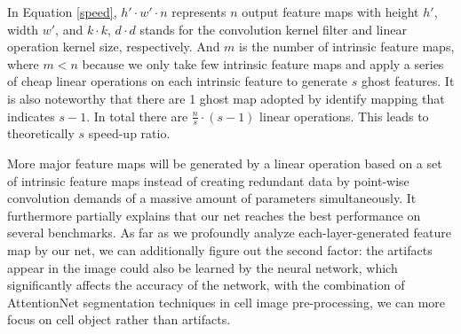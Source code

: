 In Equation \eqref{speed}, ${h}' \cdot {w}' \cdot {n}$ represents  $n$ output feature maps with height ${h}'$, width ${w}'$, and $k \cdot k$, $d \cdot d$ stands for the convolution kernel filter and linear operation kernel size, respectively. And $m$ is the number of intrinsic feature maps, where $m < n$ because we only take few intrinsic feature maps and apply a series of cheap linear operations on each intrinsic feature to generate $s$ ghost features. It is also noteworthy that there are 1 ghost map adopted by identify mapping that indicates $s-1$. In total there are $\frac{n}{s} \cdot(s-1)$  linear operations. This leads to theoretically $s$ speed-up ratio.

More major feature maps will be generated by a linear operation based on a set of intrinsic feature maps instead of creating redundant data by point-wise convolution demands of a massive amount of parameters simultaneously. It furthermore partially explains that our net reaches the best performance on several benchmarks.
As far as we profoundly analyze each-layer-generated feature map by our net, we can additionally figure out the second factor: the artifacts appear in the image could also be learned by the neural network, which significantly affects the accuracy of the network, with the combination of AttentionNet segmentation techniques in cell image pre-processing, we can more focus on cell object rather than artifacts.


